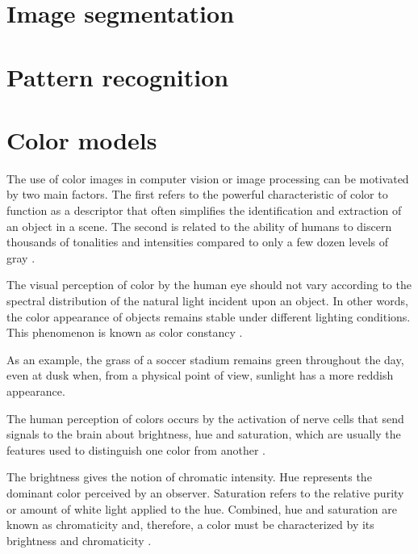 \section{Image segmentation}
\label{sec:image_segmentation}

\section{Pattern recognition}
\label{sec:pattern_recognition}

\section{Color models}
\label{sec:color_models}

The use of color images in computer vision or image processing can be motivated by two main factors. The first refers to the powerful characteristic of color to function as a descriptor that often simplifies the identification and extraction of an object in a scene. The second is related to the ability of humans to discern thousands of tonalities and intensities compared to only a few dozen levels of gray \citep{gonzalez:02}.

The visual perception of color by the human eye should not vary according to the spectral distribution of the natural light incident upon an object. In other words, the color appearance of objects remains stable under different lighting conditions. This phenomenon is known as color constancy \citep{gevers:12}.

As an example, the grass of a soccer stadium remains green throughout the day, even at dusk when, from a physical point of view, sunlight has a more reddish appearance.

The human perception of colors occurs by the activation of nerve cells that send signals to the brain about brightness, hue and saturation, which are usually the features used to distinguish one color from another \citep{gonzalez:02}.

The brightness gives the notion of chromatic intensity. Hue represents the dominant color perceived by an observer. Saturation refers to the relative purity or amount of white light applied to the hue. Combined, hue and saturation are known as chromaticity and, therefore, a color must be characterized by its brightness and chromaticity \citep{gonzalez:02}.


